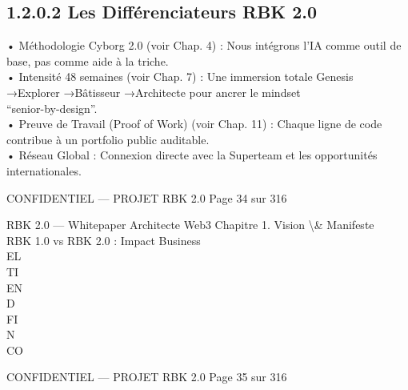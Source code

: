 \subsection{1.2.0.2 Les Différenciateurs RBK 2.0}
\vspace{0.5em}
• Méthodologie Cyborg 2.0 (voir Chap. 4) : Nous intégrons l’IA comme outil de base, pas comme aide à la triche.\\
\vspace{0.5em}
• Intensité 48 semaines (voir Chap. 7) : Une immersion totale Genesis →Explorer →Bâtisseur →Architecte pour ancrer le mindset\\
“senior-by-design”.\\
\vspace{0.5em}
• Preuve de Travail (Proof of Work) (voir Chap. 11) : Chaque ligne de code contribue à un portfolio public auditable.\\
\vspace{0.5em}
• Réseau Global : Connexion directe avec la Superteam et les opportunités internationales.\\
\vspace{0.5em}
\vspace{0.5em}
\begin{confidential}CONFIDENTIEL — PROJET RBK 2.0                                 Page 34 sur 316\end{confidential}
RBK 2.0 — Whitepaper Architecte Web3                           Chapitre 1. Vision \textbackslash{}& Manifeste\\
\vspace{0.5em}
\vspace{0.5em}
RBK 1.0 vs RBK 2.0 : Impact Business\\
\vspace{0.5em}
\vspace{0.5em}
\vspace{0.5em}
\vspace{0.5em}
EL\\
TI\\
EN\\
D\\
FI\\
N\\
CO\\
\vspace{0.5em}
\vspace{0.5em}
\vspace{0.5em}
\vspace{0.5em}
\begin{confidential}CONFIDENTIEL — PROJET RBK 2.0                Page 35 sur 316\end{confidential}
